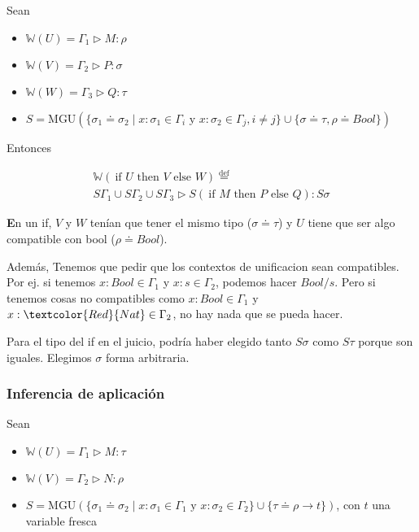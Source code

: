 \documentclass{report}
\theoremstyle{definition} %
\newenvironment{nota}[1]
    {\begin{leftbar}\textbf{#1}}
    {\end{leftbar}}
\newcommand{\eqdef}{\overset{\text{def}}{=}}
\newcommand{\tfunc}[2]{#1 \to #2}
\newcommand{\ifte}[3]{\ \text{if } #1 \text{ then } #2 \text{ else } #3}
\newcommand{\tipa}[3]{#1 \rhd #2 : #3} %
\newcommand{\changed}[1]{\textcolor{Red}{#1}}
\newcommand{\tsust}[1]{S#1} %
\newcommand{\sustfor}[2]{#1/#2} %
\newcommand{\infer}[1]{\mathbb{W}(#1)}
\newcommand{\unify}[2]{#1 \doteq #2}
\begin{document}
Sean

\begin{itemize}
    \item $\infer{U} = \tipa{\Gamma_1}{M}{\rho}$
    \item $\infer{V} = \tipa{\Gamma_2}{P}{\sigma}$
    \item $\infer{W} = \tipa{\Gamma_3}{Q}{\tau}$
    \item
    $S = \text{MGU}(
        \{
            \unify{\sigma_1}{\sigma_2} \mid
            x : \sigma_1 \in \Gamma_i
            \text{ y } x : \sigma_2 \in \Gamma_j,
            i \neq j
        \}
        \cup \{ \unify{\sigma}{\tau}, \unify{\rho}{Bool} \}
    )$
\end{itemize}

Entonces

\begin{gather*}
    \infer{\ifte{U}{V}{W}} \eqdef\\
    \tipa
        {\tsust{\Gamma_1} \cup \tsust{\Gamma_2} \cup \tsust{\Gamma_3}}
        {\tsust{(\ifte{M}{P}{Q})}}
        {\tsust{\sigma}}
\end{gather*}

\begin{nota}
    En un if, $V$ y $W$ tenían que tener el mismo tipo ($\unify{\sigma}{\tau}$)
    y $U$ tiene que ser algo compatible con bool ($\unify{\rho}{Bool}$).

    Además, Tenemos que pedir que los contextos de unificacion sean compatibles.
    Por ej. si tenemos $x : Bool \in \Gamma_1$ y $x : s \in \Gamma_2$, podemos
    hacer $\sustfor{Bool}{s}$. Pero si tenemos cosas no compatibles como $x :
    Bool \in \Gamma_1$ y $x : \changed{Nat} \in \Gamma_2$, no hay nada que se
    pueda hacer.

    Para el tipo del if en el juicio, podría haber elegido tanto
    $\tsust{\sigma}$ como $\tsust{\tau}$ porque son iguales. Elegimos $\sigma$
   forma arbitraria.
\end{nota}

\subsubsection{Inferencia de aplicación}

Sean

\begin{itemize}
    \item $\infer{U} = \tipa{\Gamma_1}{M}{\tau}$
    \item $\infer{V} = \tipa{\Gamma_2}{N}{\rho}$
    \item $S = \text{MGU} (
        \{
            \unify{\sigma_1}{\sigma_2} \mid
            x : \sigma_1 \in \Gamma_1
            \text{ y } x : \sigma_2 \in \Gamma_2
        \}
        \cup \{ \unify{\tau}{\tfunc{\rho}{t}} \}
    )$, con $t$ una variable fresca
\end{itemize}
\end{document}
